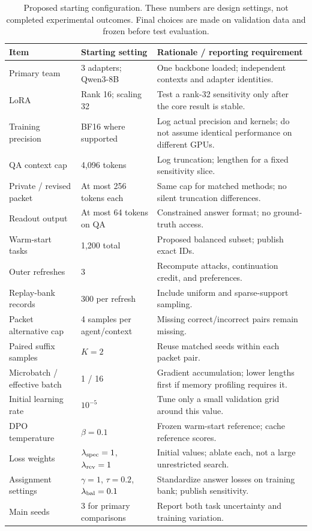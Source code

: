 \documentclass[10pt,twocolumn]{article}
\begin{document}
\begin{table}[h]
\centering\small
\caption{Proposed starting configuration. These numbers are design settings, not completed experimental outcomes. Final choices are made on validation data and frozen before test evaluation.}
\label{tab:config}
\begin{tabularx}{0.95\textwidth}{@{}p{}p{}X@{}}
\toprule
Item & Starting setting & Rationale / reporting requirement \\
\midrule
Primary team & 3 adapters; Qwen3-8B & One backbone loaded; independent contexts and adapter identities. \\
LoRA & Rank 16; scaling 32 & Test a rank-32 sensitivity only after the core result is stable. \\
Training precision & BF16 where supported & Log actual precision and kernels; do not assume identical performance on different GPUs. \\
QA context cap & 4,096 tokens & Log truncation; lengthen for a fixed sensitivity slice. \\
Private / revised packet & At most 256 tokens each & Same cap for matched methods; no silent truncation differences. \\
Readout output & At most 64 tokens on QA & Constrained answer format; no ground-truth access. \\
Warm-start tasks & 1,200 total & Proposed balanced subset; publish exact IDs. \\
Outer refreshes & 3 & Recompute attacks, continuation credit, and preferences. \\
Replay-bank records & 300 per refresh & Include uniform and sparse-support sampling. \\
Packet alternative cap & 4 samples per agent/context & Missing correct/incorrect pairs remain missing. \\
Paired suffix samples & $K=2$ & Reuse matched seeds within each packet pair. \\
Microbatch / effective batch & 1 / 16 & Gradient accumulation; lower lengths first if memory profiling requires it. \\
Initial learning rate & $10^{-5}$ & Tune only a small validation grid around this value. \\
DPO temperature & $\beta=0.1$ & Frozen warm-start reference; cache reference scores. \\
Loss weights & $\lambda_{\rm spec}=1$, $\lambda_{\rm rev}=1$ & Initial values; ablate each, not a large unrestricted search. \\
Assignment settings & $\gamma=1$, $\tau=0.2$, $\lambda_{\rm bal}=0.1$ & Standardize answer losses on training bank; publish sensitivity. \\
Main seeds & 3 for primary comparisons & Report both task uncertainty and training variation. \\
\bottomrule
\end{tabularx}
\end{table}
\end{document}
